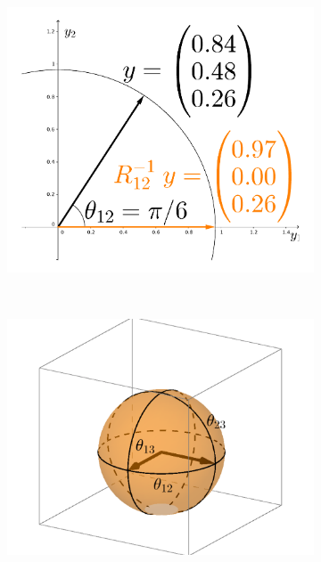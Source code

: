 \documentclass{article}
\begin{document}
\begin{figure}
    \centering
    \begin{subfigure}[b]{0.3\textwidth}
        \includegraphics[width=\textwidth]{GivensReduction.pdf}
        \caption{}
        \label{fig:GivensReduction}
    \end{subfigure}
    ~ %
    \begin{subfigure}[b]{0.3\textwidth}
        \includegraphics[width=\textwidth]{StiefelGeom.pdf}

\end{subfigure}
\end{figure}
\end{document}
